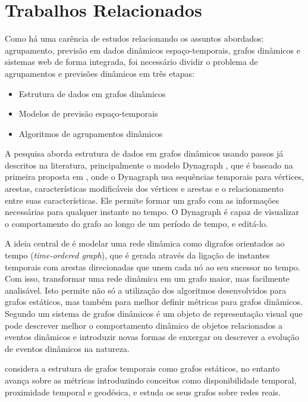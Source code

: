 \pagebreak
\section{Trabalhos Relacionados}
 \label{trabalhos-relacionados} 
Como há uma carência de estudos relacionando os assuntos abordados: agrupamento,
previsão em dados dinâmicos espaço-temporais, grafos dinâmicos e sistemas web
de forma integrada, foi necessário dividir o problema de agrupamentos e previsões dinâmicos em três etapas:
\begin{itemize}
\item Estrutura de dados em grafos dinâmicos
\item Modelos de previsão espaço-temporais
\item Algoritmos de agrupamentos dinâmicos
\end{itemize}

A pesquisa aborda estrutura de dados em grafos dinâmicos usando passos já descritos na literatura,
principalmente o modelo Dynagraph \cite{dynagraph}, que é baseado na primeira proposta
em \cite{dynagraph2012}, onde o Dynagraph usa sequências temporais para vértices, arestas,
características modificáveis dos vértices e arestas e o relacionamento entre suas características.
Ele permite formar um grafo com as informações necessárias para qualquer instante no tempo.
O Dynagraph é capaz de visualizar o comportamento do grafo ao longo de um período de tempo,
e editá-lo.

A ideia central de \cite{kim} é modelar uma rede dinâmica como digrafos orientados ao
tempo (\textit{time-ordered graph}), que é gerada através da ligação de instantes temporais com arestas
direcionadas que unem cada nó ao seu sucessor no tempo. Com isso, transformar uma rede dinâmica
em um grafo maior, mas facilmente analisável. Isto permite não só a utilização dos algoritmos 
desenvolvidos para grafos estáticos, mas também para melhor definir métricas para grafos dinâmicos.
Segundo \cite{kim} um sistema de grafos dinâmicos é um objeto de representação visual
que pode descrever melhor o comportamento dinâmico de objetos relacionados a eventos dinâmicos e
introduzir novas formas de enxergar ou descrever a evolução de eventos dinâmicos na natureza.

\cite{kostakos} considera a estrutura de grafos temporais como grafos
estáticos, no entanto avança sobre as métricas introduzindo conceitos como disponibilidade
temporal, proximidade temporal e geodésica, e estuda os seus grafos sobre redes reais.












